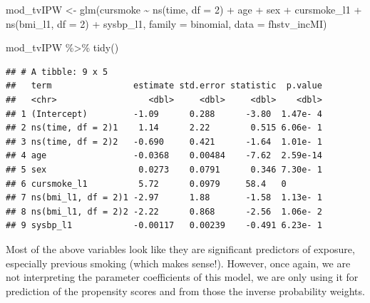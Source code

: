 \documentclass[
]{book}
\newenvironment{Shaded}{\begin{snugshade}}{\end{snugshade}}
\newcommand{\AttributeTok}[1]{\textcolor[rgb]{0.77,0.63,0.00}{#1}}
\newcommand{\DecValTok}[1]{\textcolor[rgb]{0.00,0.00,0.81}{#1}}
\newcommand{\FunctionTok}[1]{\textcolor[rgb]{0.00,0.00,0.00}{#1}}
\newcommand{\NormalTok}[1]{#1}
\newcommand{\OtherTok}[1]{\textcolor[rgb]{0.56,0.35,0.01}{#1}}
\newcommand{\SpecialCharTok}[1]{\textcolor[rgb]{0.00,0.00,0.00}{#1}}
\begin{document}
\begin{Shaded}
\begin{Highlighting}[]
\NormalTok{mod\_tvIPW }\OtherTok{\textless{}{-}} \FunctionTok{glm}\NormalTok{(cursmoke }\SpecialCharTok{\textasciitilde{}} \FunctionTok{ns}\NormalTok{(time, }\AttributeTok{df =} \DecValTok{2}\NormalTok{) }\SpecialCharTok{+}\NormalTok{ age }\SpecialCharTok{+} 
\NormalTok{                   sex }\SpecialCharTok{+}\NormalTok{ cursmoke\_l1 }\SpecialCharTok{+} \FunctionTok{ns}\NormalTok{(bmi\_l1, }\AttributeTok{df =} \DecValTok{2}\NormalTok{) }\SpecialCharTok{+}
\NormalTok{                   sysbp\_l1, }\AttributeTok{family =}\NormalTok{ binomial, }\AttributeTok{data =}\NormalTok{ fhstv\_incMI)}

\NormalTok{mod\_tvIPW }\SpecialCharTok{\%\textgreater{}\%}
  \FunctionTok{tidy}\NormalTok{()}
\end{Highlighting}
\end{Shaded}

\begin{verbatim}
## # A tibble: 9 x 5
##   term                estimate std.error statistic  p.value
##   <chr>                  <dbl>     <dbl>     <dbl>    <dbl>
## 1 (Intercept)         -1.09      0.288      -3.80  1.47e- 4
## 2 ns(time, df = 2)1    1.14      2.22        0.515 6.06e- 1
## 3 ns(time, df = 2)2   -0.690     0.421      -1.64  1.01e- 1
## 4 age                 -0.0368    0.00484    -7.62  2.59e-14
## 5 sex                  0.0273    0.0791      0.346 7.30e- 1
## 6 cursmoke_l1          5.72      0.0979     58.4   0       
## 7 ns(bmi_l1, df = 2)1 -2.97      1.88       -1.58  1.13e- 1
## 8 ns(bmi_l1, df = 2)2 -2.22      0.868      -2.56  1.06e- 2
## 9 sysbp_l1            -0.00117   0.00239    -0.491 6.23e- 1
\end{verbatim}

Most of the above variables look like they are significant predictors of exposure, especially previous smoking (which makes sense!). However, once again, we are not interpreting the parameter coefficients of this model, we are only using it for prediction of the propensity scores and from those the inverse probability weights.
\end{document}

